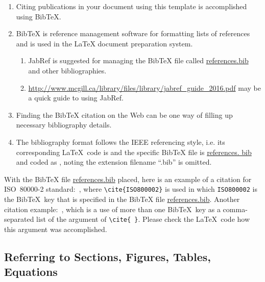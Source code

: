\begin{enumerate}
	\item Citing publications in your document using this template is accomplished using BibTeX.
	
	\item BibTeX is reference management software for formatting lists of references and is used in the LaTeX document preparation system.

	\begin{enumerate}
		\item JabRef is suggested for managing the BibTeX file called \url{references.bib} and other bibliographies. 
		
		\item \url{http://www.mcgill.ca/library/files/library/jabref_guide_2016.pdf} may be a quick guide to using JabRef.
	\end{enumerate}
	
	\item Finding the BibTeX citation on the Web can be one way of filling up necessary bibliography details. 
	
	\item The bibliography format follows the IEEE referencing style, i.e. its corresponding \LaTeX\ code is \verb|| and the specific BibTeX file is \url{references. bib} and coded as \verb||, noting the extension filename ``.bib'' is omitted.
		
\end{enumerate}

With the BibTeX file \url{references.bib} placed, here is an example of a citation for ISO~80000-2 standard:~\cite{ISO800002}, where \verb|\cite{ISO800002}| is used in which \verb|ISO800002| is the BibTeX~key that is specified in the BibTeX file \url{references.bib}.  Another citation example:~\cite{Einstein1905, Tanenbaum2002}, which is a use of more than one BibTeX~key as a comma-separated list of the argument of \verb|\cite{ }|. Please check the \LaTeX\ code how this argument was accomplished.



	
\subsection{Referring to Sections, Figures, Tables, Equations}	

